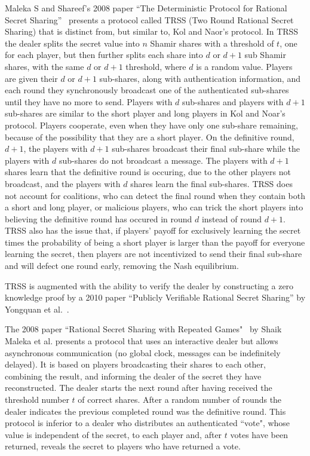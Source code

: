 \documentclass{dalcsthesis}
\begin{document}
Maleka S and Shareef's 2008 paper ``The Deterministic Protocol for Rational Secret Sharing''~\cite{MalekaS_08} presents a protocol called TRSS (Two Round Rational Secret Sharing) that is distinct from, but similar to, Kol and Naor's protocol. In TRSS the dealer splits the secret value into $n$ Shamir shares with a threshold of $t$, one for each player, but then further splits each share into $d$ or $d+1$ sub Shamir shares, with the same $d$ or $d+1$ threshold, where $d$ is a random value. Players are given their $d$ or $d+1$ sub-shares, along with authentication information, and each round they synchronously broadcast one of the authenticated sub-shares until they have no more to send. Players with $d$ sub-shares and players with $d+1$ sub-shares are similar to the short player and long players in Kol and Noar's protocol. Players cooperate, even when they have only one sub-share remaining, because of the possibility that they are a short player. On the definitive round, $d+1$, the players with $d+1$ sub-shares broadcast their final sub-share while the players with $d$ sub-shares do not broadcast a message. The players with $d+1$ shares learn that the definitive round is occuring, due to the other players not broadcast, and the players with $d$ shares learn the final sub-shares. TRSS does not account for coalitions, who can detect the final round when they contain both a short and long player, or malicious players, who can trick the short players into believing the definitive round has occured in round $d$ instead of round $d+1$. TRSS also has the issue that, if players' payoff for exclusively learning the secret times the probability of being a short player is larger than the payoff for everyone learning the secret, then players are not incentivized to send their final sub-share and will defect one round early, removing the Nash equilibrium.

TRSS is augmented with the ability to verify the dealer by constructing a zero knowledge proof by a 2010 paper ``Publicly Verifiable Rational Secret Sharing'' by Yongquan et al.~\cite{yongquan10}.

The 2008 paper ``Rational Secret Sharing with Repeated Games"~\cite{maleka08} by Shaik Maleka et al. presents a protocol that uses an interactive dealer but allows asynchronous communication (no global clock, messages can be indefinitely delayed). It is based on players broadcasting their shares to each other, combining the result, and informing the dealer of the secret they have reconstructed. The dealer starts the next round after having received the threshold number $t$ of correct shares. After a random number of rounds the dealer indicates the previous completed round was the definitive round. This protocol is inferior to a dealer who distributes an authenticated ``vote", whose value is independent of the secret, to each player and, after $t$ votes have been returned, reveals the secret to players who have returned a vote. 
\end{document}
